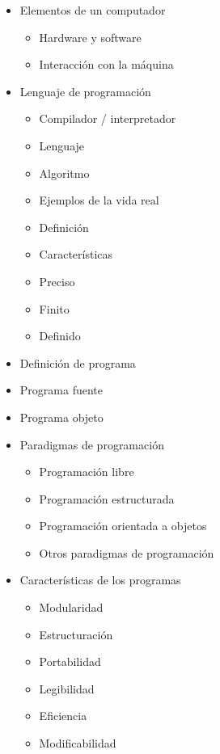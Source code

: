\begin{itemize}
	\item Elementos de un computador
	\begin{itemize}
		\item Hardware y software
		\item Interacción con la máquina
	\end{itemize}
	\item Lenguaje de programación
	\begin{itemize}
		\item Compilador / interpretador
		\item Lenguaje
		\end{itemize}
		\begin{itemize}
			\item Algoritmo
			\item Ejemplos de la vida real
			\item Definición
			\item Características
		\end{itemize}
		\begin{itemize}
			\item Preciso
			\item Finito
			\item Definido
		\end{itemize}
\item Definición de programa
\item Programa fuente
\item Programa objeto
\item Paradigmas de programación
	\begin{itemize}
	\item Programación libre
	\item Programación estructurada
	\item Programación orientada a objetos
	\item Otros paradigmas de programación
	\end{itemize}
\item Características de los programas
		\begin{itemize}
			\item Modularidad
			\item Estructuración
			\item Portabilidad
			\item Legibilidad
			\item Eficiencia
			\item Modificabilidad
		\end{itemize}

\end{itemize}
